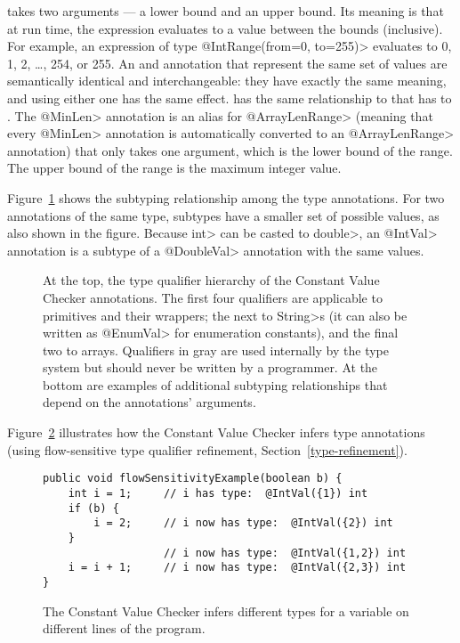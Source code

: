  takes two arguments --- a lower
bound and an upper bound.  Its meaning is that at run time, the expression
evaluates to a value between the bounds (inclusive).  For example, an
expression of type \<@IntRange(from=0, to=255)> evaluates to
0, 1, 2, \ldots, 254, or 255.
An  and
 annotation that represent the
same set of values are semantically identical and interchangeable:  they
have exactly the same meaning, and using either one has the same effect.
 has the same relationship
to  that
 has to
.
The \<@MinLen> annotation is an alias for \<@ArrayLenRange> (meaning that every \<@MinLen> annotation
 is automatically converted to an \<@ArrayLenRange> annotation) that only takes
one argument, which is the lower bound of the range. The upper bound of the
range is the maximum integer value.

Figure~\ref{fig-value-hierarchy} shows the
subtyping relationship among the type annotations.
For two annotations of the same type, subtypes have a smaller set of
possible values, as also shown in the figure.
Because \<int> can be casted to \<double>, an \<@IntVal> annotation is a
subtype of a \<@DoubleVal> annotation with the same values.

\begin{figure}
\caption{At the top, the type qualifier hierarchy of the Constant Value Checker
  annotations.
  The first four qualifiers are applicable to primitives and their
  wrappers; the next to \<String>s (it can also be written as \<@EnumVal> for
  enumeration constants), and the final two to arrays.
Qualifiers in gray are used
internally by the type system but should never be written by a
programmer.  At the bottom are examples of additional subtyping
relationships that depend on the annotations' arguments.}
\label{fig-value-hierarchy}
\end{figure}

Figure~\ref{fig-value-multivalue} illustrates how the Constant Value Checker
infers type annotations (using flow-sensitive type qualifier refinement, Section~\ref{type-refinement}).

\begin{figure}
\begin{Verbatim}
public void flowSensitivityExample(boolean b) {
    int i = 1;     // i has type:  @IntVal({1}) int
    if (b) {
        i = 2;     // i now has type:  @IntVal({2}) int
    }
                   // i now has type:  @IntVal({1,2}) int
    i = i + 1;     // i now has type:  @IntVal({2,3}) int
}
\end{Verbatim}
\caption{The Constant Value Checker infers different types
  for a variable on different lines of the program.}
\label{fig-value-multivalue}
\end{figure}



